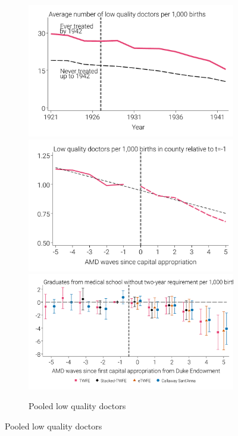 \documentclass[12pt]{article}
\begin{document}
\begin{landscape}
\begin{figure}
\begin{minipage}{\linewidth}
\begin{subfigure}[b]{0.27\textwidth}
    \end{subfigure}
    \hfill %
    \begin{subfigure}[b]{0.27\textwidth}
        \centering
        \caption{{Pooled low quality doctors}}\label{fig:md-pool-bad}
        \includegraphics[width=\linewidth]{../analysis/output/main/figure_3c1_pooled_rMD_bad_by_treat_status.pdf}
        \includegraphics[width=\linewidth]{../analysis/output/main/figure_3c2_pooled_rMD_bad_by_event_time.pdf}
        \includegraphics[width=\linewidth]{../analysis/output/main/figure_3c3_pooled_rMD_bad_first_stage.pdf}

\end{subfigure}
\end{minipage}
\end{figure}
\end{landscape}
\end{document}
